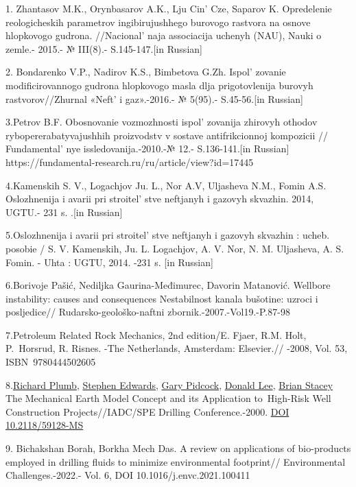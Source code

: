 \begin{references}

1. Zhantasov M.K., Orynbasarov A.K., Lju Cin'{} Cze,
Saparov K. Opredelenie reologicheskih parametrov ingibirujushhego
burovogo rastvora na osnove hlopkovogo gudrona.
//Nacional' naja associacija uchenyh (NAU), Nauki o
zemle.- 2015.- № III(8).- S.145-147.{[}in Russian{]}

2. Bondarenko V.P., Nadirov K.S., Bimbetova G.Zh.
Ispol' zovanie modificirovannogo gudrona hlopkovogo masla
dlja prigotovlenija burovyh rastvorov//Zhurnal «Neft'{} i
gaz».-2016.- № 5(95).- S.45-56.{[}in Russian{]}

3.Petrov B.F. Obosnovanie vozmozhnosti ispol' zovanija
zhirovyh othodov rybopererabatyvajushhih \linebreak proizvodstv v sostave
antifrikcionnoj kompozicii // Fundamental' nye
issledovanija.-2010.-№ 12.- S.136-141.{[}in Russian{]}
https://fundamental-research.ru/ru/article/view?id=17445

4.Kamenskih S. V., Logachjov Ju. L., Nor A.V, Uljasheva N.M., Fomin A.S.
Oslozhnenija i avarii pri stroitel' stve neftjanyh i
gazovyh skvazhin. 2014, UGTU.- 231 s. .{[}in Russian{]}

5.Oslozhnenija i avarii pri stroitel' stve neftjanyh i
gazovyh skvazhin : ucheb. posobie / S. V. Kamenskih, Ju. L. Logachjov,
A. V. Nor, N. M. Uljasheva, A. S. Fomin. - Uhta : UGTU, 2014. -231 s.
{[}in Russian{]}

6.Borivoje Pašić, Nediljka Gaurina-Međimurec, Davorin Matanović.
Wellbore instability: causes and \linebreak consequences Nestabilnost kanala
bušotine: uzroci i posljedice// Rudarsko-geološko-naftni
zbornik.-2007.-Vol19.-P.87-98

7.Petroleum Related Rock Mechanics, 2nd edition/E. Fjaer, R.M. Holt,
P.~Horsrud, R. Risnes. \linebreak -The Netherlands, Amsterdam: Elsevier.// -2008,
Vol. 53, ISBN~9780444502605

8.\href{javascript:;}{Richard Plumb}, \href{javascript:;}{Stephen
Edwards}, \href{javascript:;}{Gary Pidcock}, \href{javascript:;}{Donald
Lee}, \href{javascript:;}{Brian Stacey} The Mechanical Earth Model
Concept and its Application to~High-Risk Well Construction
Projects//IADC/SPE Drilling Conference.-2000.
\href{https://doi.org/10.2118/59128-MS}{DOI 10.2118/59128-MS}

9. Bichakshan Borah, Borkha Mech Das. A review on applications of
bio-products employed in drilling fluids to minimize environmental
footprint// Environmental Challenges.-2022.- Vol. 6, \linebreak DOI
10.1016/j.envc.2021.100411


\end{references}
